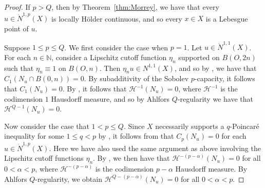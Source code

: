 \documentclass[10pt]{amsart}
\def\Xint#1{\mathchoice
	{\XXint\displaystyle\textstyle{#1}}
	{\XXint\textstyle\scriptstyle{#1}}
	{\XXint\scriptstyle\scriptscriptstyle{#1}}
	{\XXint\scriptscriptstyle\scriptscriptstyle{#1}}
	\!\int}
\def\XXint#1#2#3{{\setbox0=\hbox{$#1{#2#3}{\int}$ }
		\vcenter{\hbox{$#2#3$ }}\kern-.6\wd0}}
\def\dashint{\Xint-}
\numberwithin{equation}{section}
\newcommand{\N}{\mathbb{N}}
\newcommand{\Ha}{\mathcal{H}}
\begin{document}
\begin{proof}
If $p>Q$, then by Theorem~\ref{thm:Morrey}, we have that every $u\in\dot N^{1,p}(X)$ is locally H\"older continuous, and so every $x\in X$ is a Lebesgue point of $u$.  

Suppose $1\le p\le Q$.  We first consider the case when $p=1$. Let $u\in \dot N^{1,1}(X)$.  For each $n\in\N$, consider a Lipschitz cutoff function $\eta_n$ supported on $B(O,2n)$ such that $\eta_n\equiv 1$ on $B(O,n)$.  Then $\eta_n u\in N^{1,1}(X)$, and so by \cite[Theorem~4.1, Remark~4.7]{KKST08}, we have that $C_1(N_u\cap B(0,n))=0$.  By subadditivity of the Sobolev $p$-capacity, it follows that $C_1(N_u)=0$. By \cite[Theorem~4.3, Theorem~5.1]{HK10}, it follows that $\Ha^{-1}(N_u)=0$, where $\Ha^{-1}$ is the codimension $1$ Hausdorff  measure, and so by Ahlfors $Q$-regularity we have that $\Ha^{Q-1}(N_u)=0$.

Now consider the case that $1<p\le Q$.  Since $X$ necessarily supports a $q$-Poincar\'e inequality for some $1\le q<p$ by \cite{KZ08}, it follows from \cite[Theorem~5.6.2]{BB15} that $C_p(N_u)=0$ for each $u\in\dot N^{1,p}(X)$.  Here we have also used the same argument as above involving the Lipschitz cutoff functions $\eta_n$.  By \cite[Proposition~3.11]{GKS23}, we then have that $\Ha^{-(p-\alpha)}(N_u)=0$ for all $0<\alpha<p$, where $\Ha^{-(p-\alpha)}$ is the codimension $p-\alpha$ Hausdorff  measure. By Ahlfors $Q$-regularity, we obtain $\Ha^{Q-(p-\alpha)}(N_u)=0$ for all $0<\alpha<p$.
 \qedhere 
 





 

\end{proof}
\end{document}
